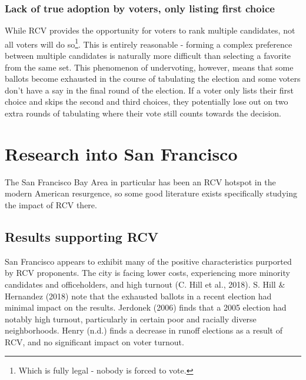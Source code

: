 \documentclass[12pt,twoside]{reedthesis}
\begin{document}
\hypertarget{lack-of-true-adoption-by-voters-only-listing-first-choice}{%
\subsubsection{Lack of true adoption by voters, only listing first choice}\label{lack-of-true-adoption-by-voters-only-listing-first-choice}}

While RCV provides the opportunity for voters to rank multiple candidates, not all voters will do so\footnote{Which is fully legal - nobody is forced to vote.}. This is entirely reasonable - forming a complex preference between multiple candidates is naturally more difficult than selecting a favorite from the same set. This phenomenon of undervoting, however, means that some ballots become exhausted in the course of tabulating the election and some voters don't have a say in the final round of the election. If a voter only lists their first choice and skips the second and third choices, they potentially lose out on two extra rounds of tabulating where their vote still counts towards the decision.

\hypertarget{research-into-san-francisco}{%
\section{Research into San Francisco}\label{research-into-san-francisco}}

The San Francisco Bay Area in particular has been an RCV hotspot in the modern American resurgence, so some good literature exists specifically studying the impact of RCV there.

\hypertarget{results-supporting-rcv}{%
\subsection{Results supporting RCV}\label{results-supporting-rcv}}

San Francisco appears to exhibit many of the positive characteristics purported by RCV proponents. The city is facing lower costs, experiencing more minority candidates and officeholders, and high turnout (C. Hill et al., 2018). S. Hill \& Hernandez (2018) note that the exhausted ballots in a recent election had minimal impact on the results. Jerdonek (2006) finds that a 2005 election had notably high turnout, particularly in certain poor and racially diverse neighborhoods. Henry (n.d.) finds a decrease in runoff elections as a result of RCV, and no significant impact on voter turnout.
\end{document}
